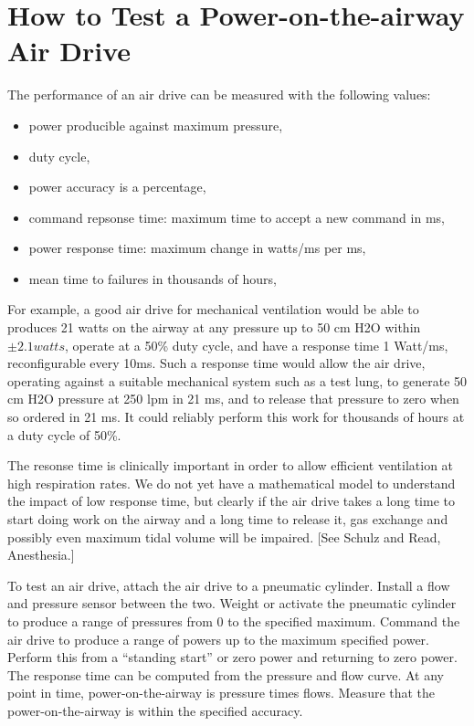 \documentclass{article}
\begin{document}
\section{How to Test a  Power-on-the-airway Air Drive}

The performance of an air drive can be measured with the following values:
\begin{itemize}
\item{power producible against maximum pressure,}
\item{duty cycle,}
\item{power accuracy is a percentage,}
\item{command repsonse time: maximum time to accept a new command in ms,}
\item{power response time: maximum change in watts/ms per ms,}
\item{mean time to failures in thousands of hours,}
\end{itemize}


For example, a good air drive for mechanical ventilation would be
able to produces 21 watts on the airway at any pressure up to 50 cm H2O within
$\pm 2.1 watts$, operate at a
50\% duty cycle, and have a response time 1 Watt/ms, reconfigurable every 10ms.
Such a response time
would allow the air drive, operating against a suitable mechanical system such
as a test lung, to generate 50 cm H2O pressure at 250 lpm in 21 ms, and
to release that pressure to zero when so ordered in 21 ms.
It could reliably perform this work for thousands of hours at a duty cycle of 50\%.

The resonse time is clinically important in order to allow efficient ventilation
at high respiration rates.
We do not yet have a mathematical model to understand the impact of low response time,
but clearly if the air drive takes a long time to start doing work on the airway
and a long time to release it, gas exchange and possibly even maximum tidal volume
will be impaired. [See Schulz and Read, Anesthesia.]

To test an air drive, attach the air drive to a pneumatic cylinder. Install a flow
and pressure sensor between the two. Weight or activate the pneumatic cylinder
to produce a range of pressures from 0 to the specified maximum. Command the air drive
to produce a range of powers up to the maximum specified power. Perform this
from a ``standing start'' or zero power and returning to zero power. The response time
can be computed from the pressure and flow curve. At any point in time, power-on-the-airway
is pressure times flows. Measure that the power-on-the-airway is within the specified
accuracy.
\end{document}
